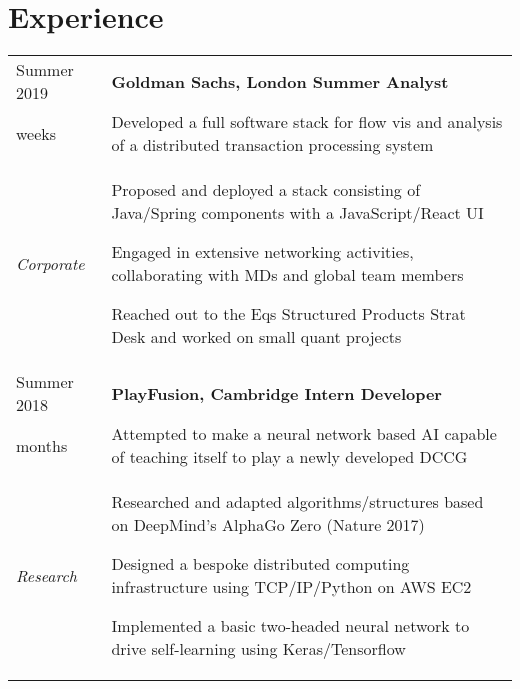 \documentclass[letterpaper, 10pt]{article}
\begin{document}
\vspace{-0.5\baselineskip}

\section*{Experience}
\begin{tabularx}{\linewidth}{>{\raggedleft}p{2.2cm}|X}
Summer 2019 & \textbf{Goldman Sachs, London \hfill Summer Analyst}\\
10 weeks & Developed a full software stack for flow vis and analysis of a distributed transaction processing system\\
\textit{Corporate} &
\vspace{-.5\baselineskip}
\begin{compact}
	\item Proposed and deployed a stack consisting of Java/Spring components with a JavaScript/React UI
	\item Engaged in extensive networking activities, collaborating with MDs and global team members
	\item Reached out to the Eqs Structured Products Strat Desk and worked on small quant projects
	\vspace{-.5\baselineskip}
\end{compact}\\
Summer 2018 & \textbf{PlayFusion, Cambridge \hfill Intern Developer}\\
3 months & Attempted to make a neural network based AI capable of teaching itself to play a newly developed DCCG\\
\textit{Research} &
\vspace{-.5\baselineskip}
\begin{compact}
	\item Researched and adapted algorithms/structures based on DeepMind's AlphaGo Zero (Nature 2017)
	\item Designed a bespoke distributed computing infrastructure using TCP/IP/Python on AWS EC2
	\item Implemented a basic two-headed neural network to drive self-learning using Keras/Tensorflow

\end{compact}
\end{tabularx}
\end{document}
